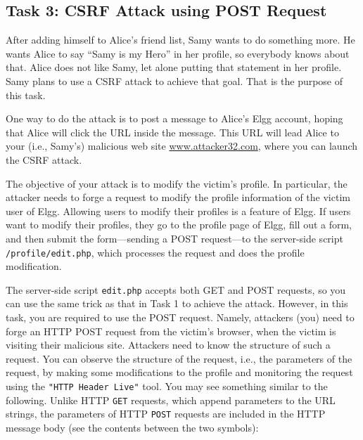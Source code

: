 \subsection{Task 3: CSRF Attack using POST Request}

After adding himself to Alice's friend list, Samy wants to do something more. He 
wants Alice to say ``Samy is my Hero'' in her profile, so everybody knows 
about that. Alice does not like Samy, let alone putting that statement 
in her profile. Samy plans to use a CSRF attack to achieve that goal. 
That is the purpose of this task. 


One way to do the attack is to post a message to Alice's Elgg account, hoping that 
Alice will click the URL inside the message. This URL will lead Alice to your (i.e., Samy's)
malicious web site \url{www.attacker32.com}, where you can launch the
CSRF attack. 

The objective of your attack is to modify the victim's profile. 
In particular, the attacker needs to forge a request 
to modify the profile information of the victim user of Elgg. 
Allowing users to modify their profiles is a feature of 
Elgg. If  users want to modify their profiles,
they go to the profile page of Elgg, fill out 
a form, and then submit the form---sending a POST request---to 
the server-side script {\tt /profile/edit.php}, which 
processes the request and does the profile modification.


The server-side script {\tt edit.php} accepts both GET and POST requests,
so you can use the same trick as that in Task 1 to achieve the attack.
However, in this task, you are required to use the POST request. 
Namely, attackers (you) need to forge an HTTP POST request from the victim's
browser, when the victim is visiting their malicious site. 
Attackers need to know the structure of such a request.
You can observe the
structure of the request, i.e.,  the parameters of the request, by making
some modifications to the profile and monitoring the request using
the \texttt{"HTTP Header Live"} tool. 
You may see something similar to
the following. Unlike HTTP {\tt GET} requests, which append 
parameters to the URL strings, the parameters of HTTP {\tt POST} requests are 
included in the HTTP message body (see the contents between the two 
 symbols): 


